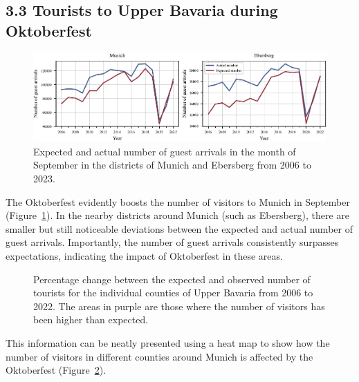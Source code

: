 \documentclass{article}
\theoremstyle{plain}
\theoremstyle{definition}
\theoremstyle{remark}
\begin{document}
\subsection*{3.3 Tourists to Upper Bavaria during Oktoberfest}
\begin{figure}[ht] %
\includegraphics{fig/actual_vs_expected_arrivals.pdf} %
\caption{Expected and actual number of guest arrivals in the month of September in the districts of Munich and Ebersberg from 2006 to 2023.}
\label{fig:exp_vs_actual_arrivals}
\end{figure}
The Oktoberfest evidently boosts the number of visitors to Munich in September (Figure~\ref{fig:exp_vs_actual_arrivals}). In the nearby districts around Munich (such as Ebersberg), there are smaller but still noticeable deviations between the expected and actual number of guest arrivals. Importantly, the number of guest arrivals consistently surpasses expectations, indicating the impact of Oktoberfest in these areas. 
\begin{figure}[ht]
  \centering
  \caption{Percentage change between the expected and observed number of tourists for the individual counties of Upper Bavaria from 2006 to 2022. The areas in purple are those where the number of visitors has been higher than expected.}
  \label{fig:heatmap}
\end{figure}
This information can be neatly presented using a heat map to show how the number of visitors in different counties around Munich is affected by the Oktoberfest (Figure~\ref{fig:heatmap}).\textbf{}
\end{document}
